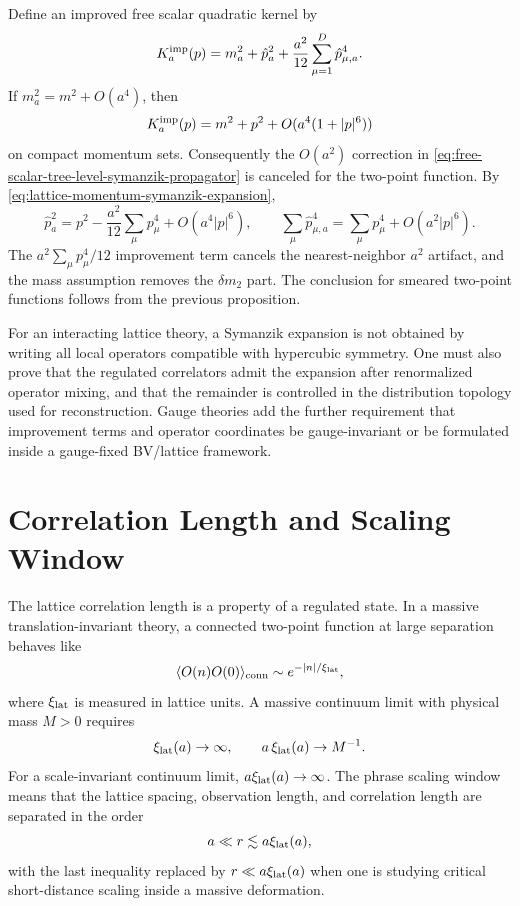 \begin{remark}
\label{rem:tree-level-scalar-symanzik-improvement}
Define an improved free scalar quadratic kernel by
\begin{equation}
  K_a^{\rm imp}(p)
  =
  m_a^2+\hat p_a^2+\frac{a^2}{12}
  \sum_{\mu=1}^D\hat p_{\mu,a}^4 .
  \label{eq:tree-level-improved-scalar-kernel}
\end{equation}
If \(m_a^2=m^2+O(a^4)\), then
\begin{equation}
  K_a^{\rm imp}(p)
  =
  m^2+p^2+O(a^4(1+|p|^6))
  \label{eq:tree-level-improved-scalar-kernel-expansion}
\end{equation}
on compact momentum sets.  Consequently the \(O(a^2)\) correction in
\eqref{eq:free-scalar-tree-level-symanzik-propagator} is canceled for the
two-point function.
By \eqref{eq:lattice-momentum-symanzik-expansion},
\[
  \hat p_a^2
  =
  p^2-\frac{a^2}{12}\sum_\mu p_\mu^4+O(a^4|p|^6),
  \qquad
  \sum_\mu\hat p_{\mu,a}^4
  =
  \sum_\mu p_\mu^4+O(a^2|p|^6).
\]
The \(a^2\sum_\mu p_\mu^4/12\) improvement term cancels the
nearest-neighbor \(a^2\) artifact, and the mass assumption removes the
\(\delta m_2\) part.  The conclusion for smeared two-point functions follows
from the previous proposition.
\end{remark}

\begin{remark}
\label{rem:symanzik-interacting-status}
For an interacting lattice theory, a Symanzik expansion is not obtained by
writing all local operators compatible with hypercubic symmetry.  One must
also prove that the regulated correlators admit the expansion after
renormalized operator mixing, and that the remainder is controlled in the
distribution topology used for reconstruction.  Gauge theories add the
further requirement that improvement terms and operator coordinates be
gauge-invariant or be formulated inside a gauge-fixed BV/lattice framework.
\end{remark}

\section{Correlation Length and Scaling Window}

The lattice correlation length is a property of a regulated state.  In a
massive translation-invariant theory, a connected two-point function at
large separation behaves like
\[
  \langle O(n)O(0)\rangle_{\rm conn}
  \sim e^{-|n|/\xi_{\rm lat}},
\]
where \(\xi_{\rm lat}\) is measured in lattice units.  A massive continuum
limit with physical mass \(M>0\) requires
\begin{equation}
  \xi_{\rm lat}(a)\to\infty,
  \qquad
  a\,\xi_{\rm lat}(a)\to M^{-1}.
  \label{eq:continuum-limit-massive-scaling-window}
\end{equation}
For a scale-invariant continuum limit, \(a\xi_{\rm lat}(a)\to\infty\).
The phrase scaling window means that the lattice spacing, observation
length, and correlation length are separated in the order
\[
  a\ll r\lesssim a\xi_{\rm lat}(a),
\]
with the last inequality replaced by \(r\ll a\xi_{\rm lat}(a)\) when one is
studying critical short-distance scaling inside a massive deformation.

